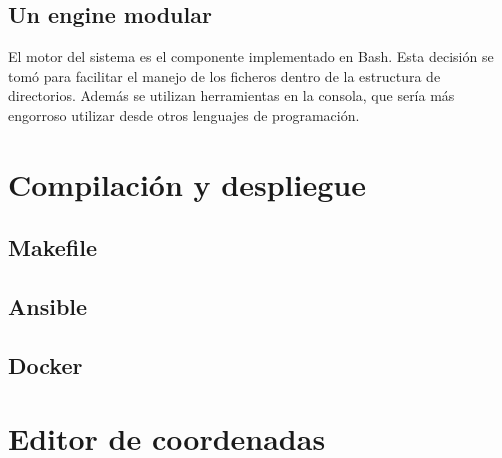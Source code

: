 \subsection{Un engine modular}

El motor del sistema es el componente implementado en Bash. Esta decisión se tomó para facilitar el manejo de los ficheros dentro de la estructura de directorios. Además se utilizan herramientas en la consola, que sería más engorroso utilizar desde otros lenguajes de programación.

\section{Compilación y despliegue}

\subsection{Makefile}

\subsection{Ansible}

\subsection{Docker}


\section{Editor de coordenadas}

